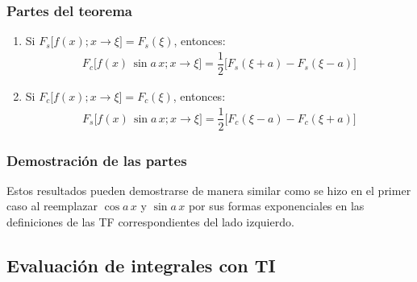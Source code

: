\begin{frame}
\frametitle{Partes del teorema}
\begin{enumerate}[<+->]
\conti
\item Si $F_{s} \big[ f (x); x \to \xi \big] = F_{s} (\xi)$, entonces:
\begin{align*}
F_{c} \big[ f (x) \, \sin a \, x; x \to \xi \big] = \dfrac{1}{2} \big[ F_{s} (\xi {+}  a) {-} F_{s} (\xi {-} a) \big]
\end{align*}
\item Si $F_{c} \big[f (x); x \to \xi \big] = F_{c} (\xi)$, entonces:
\begin{align*}
F_{s} \big[f (x) \, \sin a \, x; x \to \xi \big] = \dfrac{1}{2} \big[ F_{c} (\xi -  a) - F_{c} (\xi + a) \big]
\end{align*}
\end{enumerate}
\end{frame}
\begin{frame}
\frametitle{Demostración de las partes}
Estos resultados pueden demostrarse de manera similar como se hizo en el primer caso al reemplazar $\cos a \, x$ y $\sin a \, x$ por sus formas exponenciales en las definiciones de las TF correspondientes del lado izquierdo.
\end{frame}

\subsection{Evaluación de integrales con TI}

